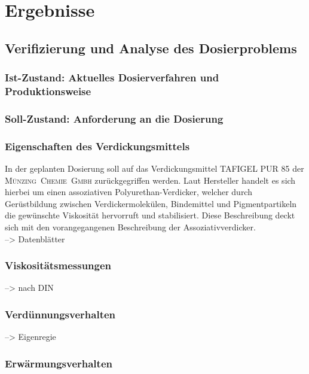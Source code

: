\newpage
\section{Ergebnisse}
\label{sec:ergebnisse}

\subsection{Verifizierung und Analyse des Dosierproblems}
\subsubsection{Ist-Zustand: Aktuelles Dosierverfahren und Produktionsweise}

\subsubsection{Soll-Zustand: Anforderung an die Dosierung}
%
\subsubsection{Eigenschaften des Verdickungsmittels}
In der geplanten Dosierung soll auf das Verdickungsmittel TAFIGEL PUR 85 der \mbox{\textsc{Münzing Chemie Gmbh}} zurückgegriffen werden. Laut Hersteller handelt es sich hierbei um einen assoziativen Polyurethan-Verdicker, welcher durch Gerüstbildung zwischen Verdickermolekülen, Bindemittel und Pigmentpartikeln die gewünschte Viskosität hervorruft und stabilisiert. Diese Beschreibung deckt sich mit den vorangegangenen Beschreibung der Assoziativverdicker.\cite{MunzingChemieGmbH.2014}\\
--> Datenblätter

\subsubsection{Viskositätsmessungen}
--> nach DIN

\subsubsection{Verdünnungsverhalten}
--> Eigenregie

\subsubsection{Erwärmungsverhalten}

